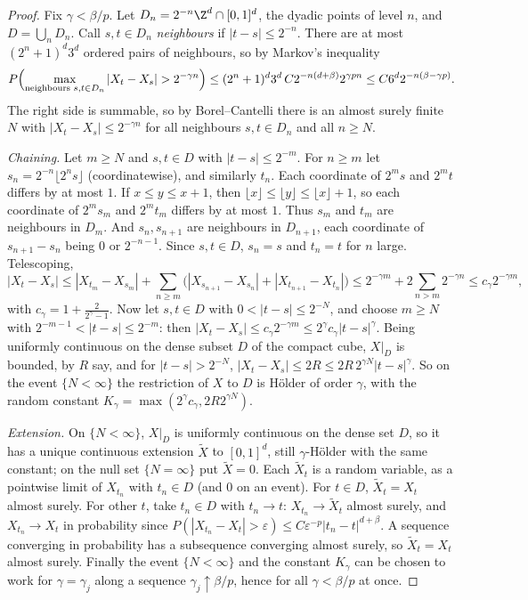 \begin{proof}
Fix $\gamma<\beta/p$. Let $D_n=2^{-n}\Z^d\cap[0,1]^d$, the dyadic points of level $n$, and $D=\bigcup_nD_n$. Call $s,t\in D_n$ \emph{neighbours} if $|t-s|\le2^{-n}$. There are at most $(2^n+1)^d3^d$ ordered pairs
of neighbours, so by Markov's inequality
\[
P\Bigl(\max_{\text{neighbours }s,t\in D_n}|X_t-X_s|>2^{-\gamma n}\Bigr)\le(2^n+1)^d3^d\,C2^{-n(d+\beta)}2^{\gamma pn}\le C6^d2^{-n(\beta-\gamma p)}.
\]
The right side is summable, so by Borel--Cantelli there is an almost surely finite $N$ with $|X_t-X_s|\le2^{-\gamma n}$ for all neighbours $s,t\in D_n$ and all $n\ge N$.

\emph{Chaining.} Let $m\ge N$ and $s,t\in D$ with $|t-s|\le2^{-m}$. For $n\ge m$ let $s_n=2^{-n}\lfloor2^ns\rfloor$ (coordinatewise), and similarly $t_n$. Each coordinate of $2^ms$ and $2^mt$ differs by at most $1$. If $x\le y\le x+1$, then $\lfloor x\rfloor\le\lfloor y\rfloor\le\lfloor x\rfloor+1$, so each coordinate of $2^ms_m$ and $2^mt_m$ differs by at most $1$. Thus $s_m$ and $t_m$ are neighbours in $D_m$. And $s_n,s_{n+1}$ are neighbours in $D_{n+1}$, each coordinate of $s_{n+1}-s_n$ being $0$ or $2^{-n-1}$. Since $s,t\in D$, $s_n=s$ and $t_n=t$ for $n$ large. Telescoping,
\[
|X_t-X_s|\le|X_{t_m}-X_{s_m}|+\sum_{n\ge m}\bigl(|X_{s_{n+1}}-X_{s_n}|+|X_{t_{n+1}}-X_{t_n}|\bigr)\le2^{-\gamma m}+2\sum_{n>m}2^{-\gamma n}\le c_\gamma2^{-\gamma m},
\]
with $c_\gamma=1+\frac2{2^\gamma-1}$. Now let $s,t\in D$ with $0<|t-s|\le2^{-N}$, and choose $m\ge N$ with $2^{-m-1}<|t-s|\le2^{-m}$: then $|X_t-X_s|\le c_\gamma2^{-\gamma m}\le2^\gamma c_\gamma|t-s|^\gamma$.
Being uniformly continuous on the dense subset $D$ of the compact cube, $X|_D$ is bounded, by $R$ say, and for $|t-s|>2^{-N}$, $|X_t-X_s|\le2R\le2R\,2^{\gamma N}|t-s|^\gamma$. So on the event
$\{N<\infty\}$ the restriction of $X$ to $D$ is H\"older of order $\gamma$, with the random constant $K_\gamma=\max(2^\gamma c_\gamma,2R2^{\gamma N})$.

\emph{Extension.} On $\{N<\infty\}$, $X|_D$ is uniformly continuous on the dense set $D$, so it has a unique continuous extension $\tilde X$ to $[0,1]^d$, still $\gamma$-H\"older with the same constant; on the null
set $\{N=\infty\}$ put $\tilde X=0$. Each $\tilde X_t$ is a random variable, as a pointwise limit of $X_{t_n}$ with $t_n\in D$ (and $0$ on an event). For $t\in D$, $\tilde X_t=X_t$ almost surely. For other $t$, take $t_n\in D$ with
$t_n\to t$: $X_{t_n}\to\tilde X_t$ almost surely, and $X_{t_n}\to X_t$ in probability since $P(|X_{t_n}-X_t|>\varepsilon)\le C\varepsilon^{-p}|t_n-t|^{d+\beta}$. A sequence converging in probability has a subsequence
converging almost surely, so $\tilde X_t=X_t$ almost surely. Finally the event $\{N<\infty\}$ and the constant $K_\gamma$ can be chosen to work for $\gamma=\gamma_j$ along a sequence $\gamma_j\uparrow\beta/p$, hence for all
$\gamma<\beta/p$ at once.
\end{proof}

